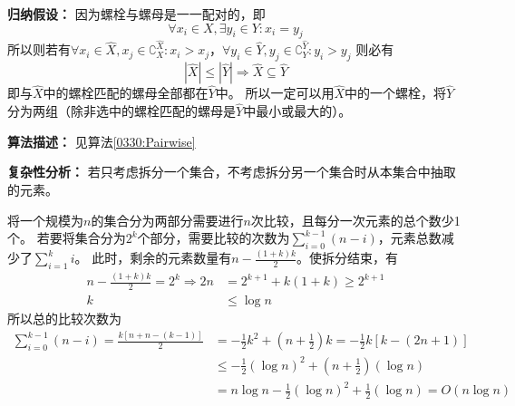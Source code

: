 \documentclass[answers]{exam}
\begin{document}
\begin{questions}
\begin{solution}
        \textbf{归纳假设：}
        因为螺栓与螺母是一一配对的，即\[ \forall x_i \in X, \exists y_i \in Y : x_i = y_j \]
        所以则若有$
            \forall x_i \in \hat{X}, x_j \in \complement_X^{\hat{X}} : x_i > x_j
        $，$
            \forall y_i \in \hat{Y}, y_j \in \complement_Y^{\hat{Y}} : y_i > y_j
        $
        则必有\[
            \left| \hat{X} \right| \le \left| \hat{Y} \right| \Rightarrow \hat{X} \subseteq \hat{Y}
        \]
        即与$\hat{X}$中的螺栓匹配的螺母全部都在$\hat{Y}$中。
        所以一定可以用$\hat{X}$中的一个螺栓，将$\hat{Y}$分为两组（除非选中的螺栓匹配的螺母是$\hat{Y}$中最小或最大的）。

        \textbf{算法描述：}
        见算法\ref{0330:Pairwise}

        \textbf{复杂性分析：}
        若只考虑拆分一个集合，不考虑拆分另一个集合时从本集合中抽取的元素。

        将一个规模为$n$的集合分为两部分需要进行$n$次比较，且每分一次元素的总个数少1个。
        若要将集合分为$2^k$个部分，需要比较的次数为$\sum_{i = 0}^{k-1} {(n-i)}$，元素总数减少了$\sum_{i=1}^k i$。
        此时，剩余的元素数量有$n - \frac{(1+k)k}{2}$。使拆分结束，有\begin{align*}
            n - \frac{(1+k)k}{2} = 2^k \Rightarrow
            2n & = 2^{k+1} + k(1+k) \ge 2^{k+1} \\
            k  & \le \log{n}
        \end{align*}
        所以总的比较次数为\begin{align*}
            \sum_{i = 0}^{k-1} {(n-i)} = \frac{k\left[n+n-(k-1)\right]}{2}
             & = - \frac{1}{2} k^2 + (n + \frac{1}{2}) k = - \frac{1}{2} k \left[ k - (2 n + 1) \right] \\
             & \le - \frac{1}{2} (\log n)^2 + (n + \frac{1}{2}) (\log n)                                \\
             & = n\log{n} - \frac{1}{2} (\log n)^2 + \frac{1}{2} (\log n) = O(n \log n)
        \end{align*}


\end{solution}
\end{questions}
\end{document}
